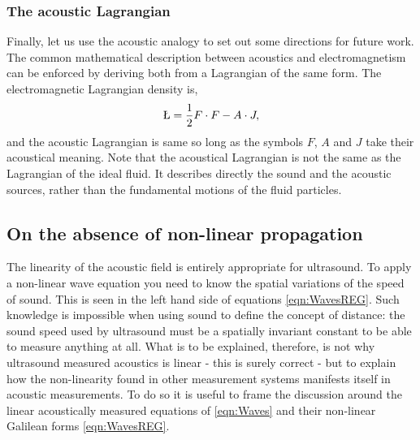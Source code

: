 \documentclass[10pt, fleqn,final,showtrims,oldfontcommands, article,a4paper,oneside]{memoir} %
\newcommand{\eqnref}[1]{\ref{eqn:#1}}
\begin{document}
\subsubsection{The acoustic Lagrangian}\label{sec:int:spin}
Finally, let us use the acoustic analogy to set out some directions for future work.
%
The common mathematical  description between acoustics and electromagnetism can be enforced by deriving both from a Lagrangian of the same form.
The electromagnetic Lagrangian density is\cite{Lasenby1993, Doran2003},
\begin{align}
 \L = \frac{1}{2} F \cdot F  - A \cdot J, \label{eqn:Lagrangian}
\end{align}
and the acoustic Lagrangian is same so long as the symbols $F$, $A$ and $J$ take their 
acoustical meaning.
Note that the acoustical Lagrangian is not the same as the Lagrangian of the ideal fluid.
It describes directly the sound and the acoustic sources,
rather than the fundamental motions of the fluid particles.


\subsection{On the absence of non-linear propagation} \label{sec:NonlinearProp}

The linearity of the acoustic field is entirely appropriate for ultrasound.
To apply a non-linear wave equation you need to know 
the spatial variations of the speed of sound. 
This is seen in the left hand side of equations \eqnref{WavesREG}.
Such knowledge is impossible
when using sound to define the concept of distance:
the sound speed used by ultrasound must be a spatially invariant constant to be able to measure anything at all.
What is to be explained, therefore, 
is not why ultrasound measured acoustics is linear - this is surely correct - 
but to explain how the non-linearity found in other measurement systems  manifests itself in acoustic measurements.
To do so it is useful to frame the discussion around the linear acoustically measured equations of
\eqnref{Waves}
and their non-linear Galilean forms \eqnref{WavesREG}.
\end{document}
